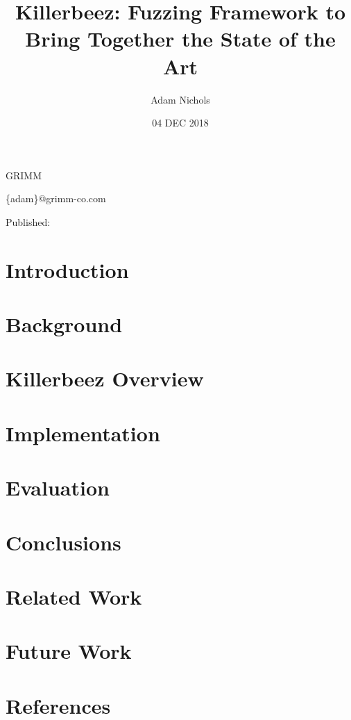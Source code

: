 \documentclass{article}
\title{Killerbeez: Fuzzing Framework to Bring Together the State of the Art}
\author{Adam Nichols}
\date{04 DEC 2018}
\begin{document}
\makeatletter
\centerline{\Large{\textbf{\@title}}}

\centerline{\@author}

\centerline{GRIMM}

\centerline{\{adam\}@grimm-co.com}

\centerline{Published: \@date}
\makeatother


\begin{multicols}{2}

\section{Introduction} \label{Introduction}


\section{Background} \label{Background}


\section{Killerbeez Overview} \label{Killerbeez Overview}


\section{Implementation} \label{Implementation}


\section{Evaluation} \label{Evaluation}

\section{Conclusions} \label{Conclusions}

\section{Related Work} \label{Related Work}

\section{Future Work} \label{Future Work}


\section{References} \label{References}
\renewcommand{\section}[2]{}  %


\end{multicols}
\end{document}
